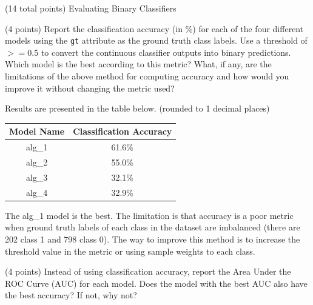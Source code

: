 \documentclass[12pt]{article}
\begin{document}
\clearpage


\begin{question}{(14 total points) Evaluating Binary Classifiers}





%
%
\begin{subquestion}{(4 points) Report the classification accuracy (in \%) for each of the four different models using the \texttt{gt} attribute as the ground truth class labels. 
Use a threshold of $>= 0.5$ to convert the continuous classifier outputs into binary predictions. 
Which model is the best according to this metric?
What, if any, are the limitations of the above method for computing accuracy and how would you improve it without changing the metric used?
}


\begin{answerbox}{15em}
Results are presented in the table below. (rounded to 1 decimal places)
\begin{center}
\begin{tabular}{|c|c|}
\hline
Model Name & Classification Accuracy \\
\hline
alg\_1 & 61.6\% \\
alg\_2 & 55.0\% \\
alg\_3 & 32.1\% \\
alg\_4 & 32.9\% \\
\hline
\end{tabular}
\end{center}
The alg\_1 model is the best. The limitation is that accuracy is a poor metric when ground truth labels of each class in the dataset are imbalanced (there are 202 class 1 and 798 class 0). The way to improve this method is to increase the threshold value in the metric or using sample weights to each class.
\end{answerbox}



\end{subquestion}



%
%
\begin{subquestion}{(4 points) Instead of using classification accuracy, report the Area Under the ROC Curve (AUC) for each model. 
Does the model with the best AUC also have the best accuracy? If not, why not?\\
}



\end{subquestion}
\end{question}
\end{document}
